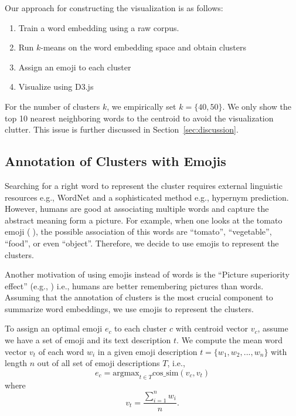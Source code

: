 Our approach for constructing the visualization is as follows:
\begin{enumerate}
 \item Train a word embedding using a raw corpus. 
 \item Run $k$-means \cite{lloyd1982least} on the word embedding space and obtain clusters
 \item Assign an emoji to each cluster
 \item Visualize using D3.js
\end{enumerate}
For the number of clusters $k$, we empirically set $k = \{40, 50\}$. 
We only show the top 10 nearest neighboring words to the centroid to avoid the visualization clutter. This issue is further discussed in Section~\ref{sec:discussion}.

\subsection{Annotation of Clusters with Emojis}
Searching for a right word to represent the cluster requires external linguistic resources e.g., WordNet and a sophisticated method e.g., hypernym prediction. 
However, humans are good at associating multiple words and capture the abstract meaning form a picture.  
For example, when one looks at the tomato emoji (🍅), the possible association of this words are ``tomato'', ``vegetable'', ``food'', or even ``object''. 
Therefore, we decide to use emojis to represent the clusters. 

Another motivation of using emojis instead of words is the ``Picture superiority effect'' (e.g., \cite{doi:10.1162/jocn.2010.21464}) i.e., humans are better remembering pictures than words. 
Assuming that the annotation of clusters is the most crucial component to summarize word embeddings, we use emojis to represent the clusters.  

To assign an optimal emoji $e_c$ to each cluster $c$ with centroid vector $v_c$, assume we have a set of emoji and its text description $t$. 
We compute the mean word vector $v_t$ of each word $w_i$ in a given emoji description $t = \{w_1, w_2, ..., w_n\}$ with length $n$ out of all set of emoji descriptions $T$, i.e.,
\begin{equation}
 e_c =  \text{argmax}_{t \in T} \text{cos\_sim}(v_c, v_t)
\end{equation}
where 
\begin{equation}
 v_t = \frac{\sum_{i = 1}^{n} w_i}{n}. 
\end{equation}

